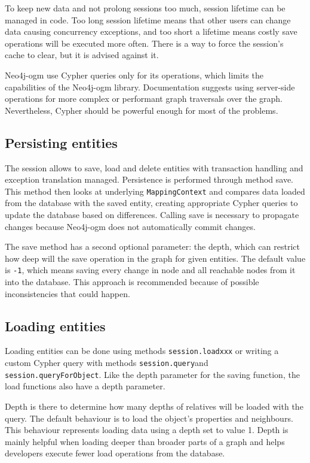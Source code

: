 To keep new data and not prolong sessions too much, session lifetime can be managed in code.
Too long session lifetime means that other users can change data causing concurrency exceptions, and too short a lifetime means costly save operations will be executed more often.
There is a way to force the session's cache to clear, but it is advised against it.

Neo4j-\acrshort{ogm} use Cypher queries only for its operations, which limits the capabilities of the Neo4j-\acrshort{ogm} library.
Documentation suggests using server-side operations for more complex or performant graph traversals over the graph.
Nevertheless, Cypher should be powerful enough for most of the problems.

\subsection {Persisting entities}

The session allows to save, load and delete entities with transaction handling and exception translation managed.
Persistence is performed through method save. This method then looks at underlying \texttt{MappingContext} and compares data loaded
from the database with the saved entity, creating appropriate Cypher queries to update the database based on differences.
Calling save is necessary to propagate changes because Neo4j-\acrshort{ogm} does not automatically commit changes.

The save method has a second optional parameter: the depth, which can restrict how deep will the save operation in the graph for given entities.
The default value is \texttt{-1}, which means saving every change in node and all reachable nodes from it into the database.
This approach is recommended because of possible inconsistencies that could happen.

\subsection {Loading entities}

Loading entities can be done using methods \texttt{session.loadxxx} or writing a custom Cypher query with methods \texttt{session.query}\linebreak and \texttt{session.queryForObject}.
Like the depth parameter for the saving function, the load functions also have a depth parameter.

Depth is there to determine how many depths of relatives will be loaded with the query.
The default behaviour is to load the object's properties and neighbours.
This behaviour represents loading data using a depth set to value 1.
Depth is mainly helpful when loading deeper than broader parts of a graph and helps developers execute fewer load operations from the database.

